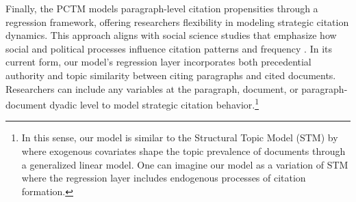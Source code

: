 Finally, the PCTM models paragraph-level citation propensities through a regression framework, offering researchers flexibility in modeling strategic citation dynamics. 
This approach aligns with social science studies that emphasize how social and political processes influence citation patterns and frequency \citep{hansford2006politics,lupu2013strategic,pelc2014politics}. 
In its current form, our model's regression layer incorporates both precedential authority and topic similarity between citing paragraphs and cited documents. 
Researchers can include any variables at the paragraph, document, or paragraph-document dyadic level to model strategic citation behavior.\footnote{In this sense, our model is similar to the Structural Topic Model (STM) by \cite{roberts2013structural} where exogenous covariates shape the topic prevalence of documents through a generalized linear model. One can imagine our model as a variation of STM where the regression layer includes endogenous processes of citation formation.}

